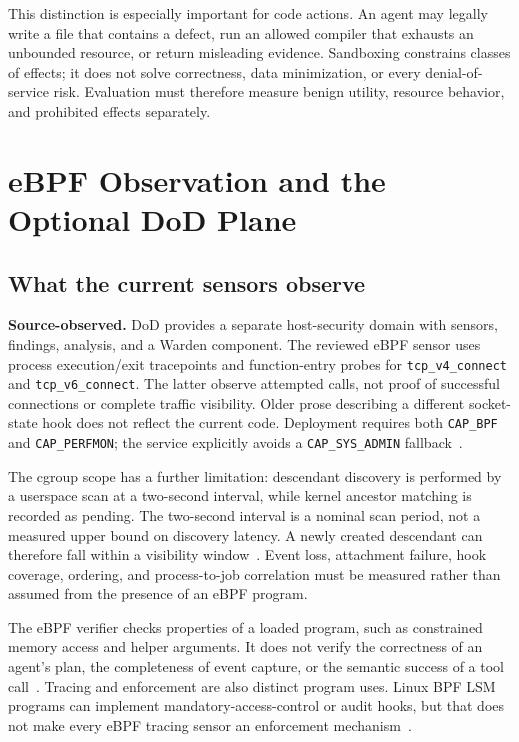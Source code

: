 This distinction is especially important for code actions. An agent may legally write a file that contains a defect, run an allowed compiler that exhausts an unbounded resource, or return misleading evidence. Sandboxing constrains classes of effects; it does not solve correctness, data minimization, or every denial-of-service risk. Evaluation must therefore measure benign utility, resource behavior, and prohibited effects separately.

\section{eBPF Observation and the Optional DoD Plane}
\label{sec:dod}

\subsection{What the current sensors observe}

\textbf{Source-observed.} DoD provides a separate host-security domain with sensors, findings, analysis, and a Warden component. The reviewed eBPF sensor uses process execution/exit tracepoints and function-entry probes for \texttt{tcp\_v4\_connect} and \texttt{tcp\_v6\_connect}. The latter observe attempted calls, not proof of successful connections or complete traffic visibility. Older prose describing a different socket-state hook does not reflect the current code. Deployment requires both \texttt{CAP\_BPF} and \texttt{CAP\_PERFMON}; the service explicitly avoids a \texttt{CAP\_SYS\_ADMIN} fallback~\cite{ref36,ref37}.

The cgroup scope has a further limitation: descendant discovery is performed by a userspace scan at a two-second interval, while kernel ancestor matching is recorded as pending. The two-second interval is a nominal scan period, not a measured upper bound on discovery latency. A newly created descendant can therefore fall within a visibility window~\cite{ref38}. Event loss, attachment failure, hook coverage, ordering, and process-to-job correlation must be measured rather than assumed from the presence of an eBPF program.

The eBPF verifier checks properties of a loaded program, such as constrained memory access and helper arguments. It does not verify the correctness of an agent's plan, the completeness of event capture, or the semantic success of a tool call~\cite{ref39}. Tracing and enforcement are also distinct program uses. Linux BPF LSM programs can implement mandatory-access-control or audit hooks, but that does not make every eBPF tracing sensor an enforcement mechanism~\cite{ref40}.

